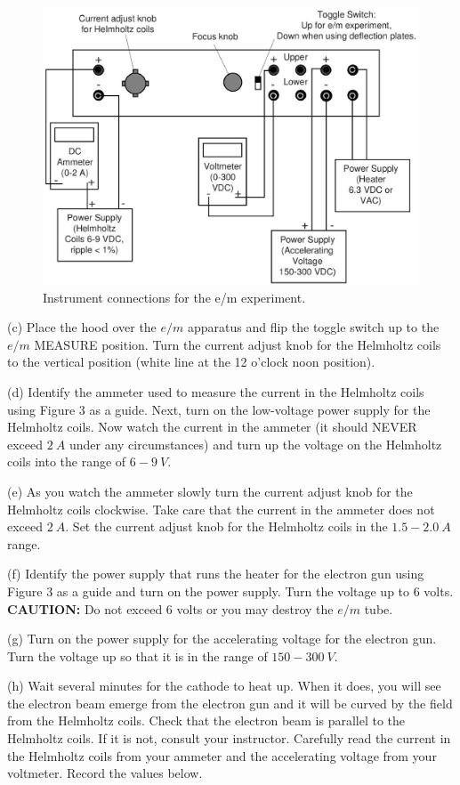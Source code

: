 \begin{figure}[hbt]
\begin{center}
\includegraphics[height=3.25in]{eoverm2/apparatus2.eps}
\caption{Instrument connections for the e/m experiment.}
\end{center}
\end{figure}

(c) Place the hood over the $e/m$ apparatus and flip the 
toggle switch up to the $e/m$ MEASURE
position.
Turn the current adjust knob for the Helmholtz coils to the vertical position (white line
at the 12 o'clock noon position).

(d) Identify the ammeter used to measure the current in the Helmholtz
coils using Figure 3 as a guide. 
Next, turn on the low-voltage power supply for the Helmholtz coils.
Now watch the current in the ammeter (it should NEVER exceed $2~A$ under
any circumstances) and
turn up the voltage on the Helmholtz coils into the range of $6-9~V$.

(e) As you watch the ammeter slowly turn the current adjust knob for the Helmholtz
coils clockwise. Take care that
the current in the ammeter does not exceed $2 ~A$.
Set the current adjust knob for the Helmholtz coils in the $1.5-2.0~A$ range.

(f) Identify the power supply that runs the heater for the electron gun using Figure 3 as a guide
and turn on the power supply. Turn the voltage up to 6 volts.
{\bf CAUTION:} Do not exceed 6 volts or you may destroy the $e/m$
tube.

(g) Turn on the power supply for the accelerating voltage for the electron gun.
Turn the voltage up so that it is in the range of $150-300~V$.

(h) Wait several minutes for the cathode to heat up. When
it does, you will see the electron beam emerge from
the electron gun and it will be curved by the field from
the Helmholtz coils. Check that the electron beam is
parallel to the Helmholtz coils. If it is not, consult your instructor.
 Carefully read the current in the Helmholtz coils from
your ammeter and the accelerating voltage from your
voltmeter. Record the values below.
\vspace{25mm}

